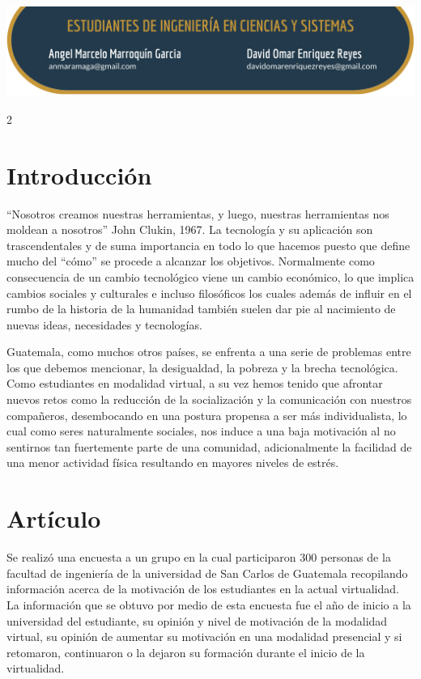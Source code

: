 \documentclass[12pt,spanish,Letterpaper,openany]{book}
\begin{document}
\begin{center}\includegraphics[width=1\linewidth]{images/pareja19_image1} \end{center}

\begin {multicols}{2}

\hypertarget{introducciuxf3n-9}{%
\section{Introducción}\label{introducciuxf3n-9}}

``Nosotros creamos nuestras herramientas, y luego, nuestras herramientas nos moldean a nosotros'' John Clukin, 1967. La tecnología y su aplicación son trascendentales y de suma importancia en todo lo que hacemos puesto que define mucho del ``cómo'' se procede a alcanzar los objetivos. Normalmente como consecuencia de un cambio tecnológico viene un cambio económico, lo que implica cambios sociales y culturales e incluso filosóficos los cuales además de influir en el rumbo de la historia de la humanidad también suelen dar pie al nacimiento de nuevas ideas, necesidades y tecnologías.

Guatemala, como muchos otros países, se enfrenta a una serie de problemas entre los que debemos mencionar, la desigualdad, la pobreza y la brecha tecnológica. Como estudiantes en modalidad virtual, a su vez hemos tenido que afrontar nuevos retos como la reducción de la socialización y la comunicación con nuestros compañeros, desembocando en una postura propensa a ser más individualista, lo cual como seres naturalmente sociales, nos induce a una baja motivación al no sentirnos tan fuertemente parte de una comunidad, adicionalmente la facilidad de una menor actividad física resultando en mayores niveles de estrés.

\hypertarget{artuxedculo-4}{%
\section{Artículo}\label{artuxedculo-4}}

Se realizó una encuesta a un grupo en la cual participaron 300 personas de la facultad de ingeniería de la universidad de San Carlos de Guatemala recopilando información acerca de la motivación de los estudiantes en la actual virtualidad. La información que se obtuvo por medio de esta encuesta fue el año de inicio a la universidad del estudiante, su opinión y nivel de motivación de la modalidad virtual, su opinión de aumentar su motivación en una modalidad presencial y si retomaron, continuaron o la dejaron su formación durante el inicio de la virtualidad.


\end{multicols}
\end{document}

